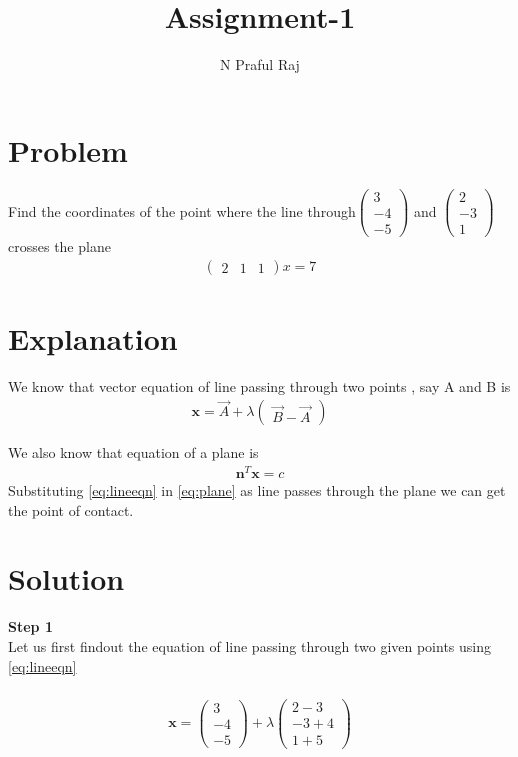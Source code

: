 \documentclass[10pt,a4paper,twocolumn]{article}
\author{N Praful Raj}
\title{\textbf{Assignment-1}}
\newcommand{\myvec}[1]{\ensuremath{\begin{pmatrix}#1\end{pmatrix}}}
\numberwithin{equation}{section}
\begin{document}
\maketitle



	
\section{Problem}
Find the coordinates of the point where the line through$ \myvec{3 \\-4 \\-5}$ and $\myvec{2 \\-3 \\1}$ crosses the plane \begin{align}\myvec{2 & 1 & 1}x=7 \end{align}

\section{Explanation}\label{Explanation}
We know that vector equation of line passing through two points , say A and B is
\begin{align}
\textbf{x} = \vec{A}+\lambda\myvec{\vec{B}-\vec{A}}\label{eq:lineeqn}
\end{align}

We also know that equation of a plane is 
\begin{align}
\textbf{n}^T\textbf{x}=c\label{eq:plane}
\end{align}
Substituting \ref{eq:lineeqn} in \ref{eq:plane} as line passes through the plane we can get the point of contact.

\section{Solution}
\textbf{Step 1}\\
Let us first findout the equation of line passing through two given points using \ref{eq:lineeqn} \\
\\
\begin{align}
\textbf{x}=\myvec{3 \\-4 \\-5}+\lambda 
\myvec{2-3 \\-3+4 \\1+5}
\end{align}
\\
\end{document}
